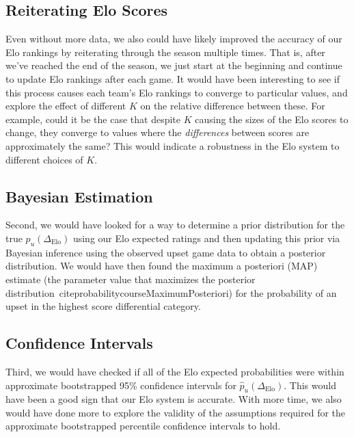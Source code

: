 \documentclass{article}
\begin{document}
\subsection{Reiterating Elo Scores}
Even without more data, we also could have likely improved the accuracy of our Elo rankings by reiterating through the season multiple times. That is, after we've reached the end of the season, we just start at the beginning and continue to update Elo rankings after each game. It would have been interesting to see if this process causes each team's Elo rankings to converge to particular values, and explore the effect of different $K$ on the relative difference between these. For example, could it be the case that despite $K$ causing the sizes of the Elo scores to change, they converge to values where the \textit{differences} between scores are approximately the same? This would indicate a robustness in the Elo system to different choices of $K$.

\subsection{Bayesian Estimation}
Second, we would have looked for a way to determine a prior distribution for the true ${p}_u(\Delta_{\text{Elo}})$ using our Elo expected ratings and then updating this prior via Bayesian inference using the observed upset game data to obtain a posterior distribution. We would have then found the maximum a posteriori (MAP) estimate (the parameter value that maximizes the posterior distribution~cite{probabilitycourseMaximumPosteriori}) for the probability of an upset in the highest score differential category.

\subsection{Confidence Intervals}
Third, we would have checked if all of the Elo expected probabilities were within approximate bootstrapped 95\% confidence intervals for $\hat{p}_u(\Delta_{\text{Elo}})$. This would have been a good sign that our Elo system is accurate. With more time, we also would have done more to explore the validity of the assumptions required for the approximate bootstrapped percentile confidence intervals to hold.
\end{document}
